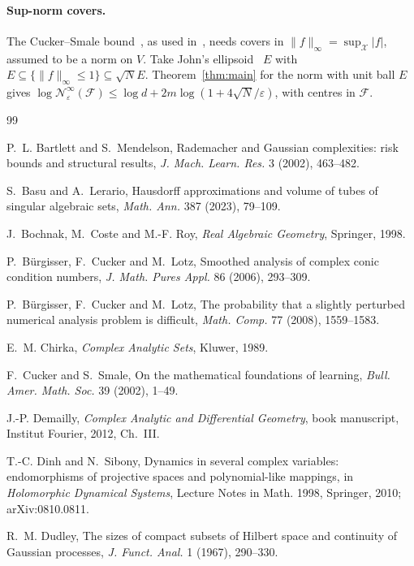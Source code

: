 \documentclass[11pt]{article}
\newcommand{\cN}{\mathcal{N}}
\newcommand{\cF}{\mathcal{F}}
\newcommand{\cX}{\mathcal{X}}
\begin{document}
\paragraph{Sup-norm covers.} The Cucker--Smale bound~\cite{CS02}, as used
in~\cite[Thm.~B.1]{MSMTK25}, needs covers in
$\|f\|_\infty=\sup_{\cX}|f|$, assumed to be a norm on $V$. Take John's
ellipsoid~\cite{Jo48} $E$ with $E\subseteq\{\|f\|_\infty\le1\}\subseteq\sqrt N E$.
Theorem~\ref{thm:main} for the norm with unit ball $E$ gives
$\log\cN^{\infty}_\varepsilon(\cF)\le\log d+2m\log(1+4\sqrt N/\varepsilon)$,
with centres in $\cF$.

\begin{thebibliography}{99}\footnotesize\setlength{\itemsep}{1pt}

 P.~L. Bartlett and S.~Mendelson, Rademacher and Gaussian
complexities: risk bounds and structural results, \emph{J. Mach. Learn. Res.}
3 (2002), 463--482.

 S.~Basu and A.~Lerario, Hausdorff approximations and volume of
tubes of singular algebraic sets, \emph{Math. Ann.} 387 (2023), 79--109.

 J.~Bochnak, M.~Coste and M.-F. Roy, \emph{Real Algebraic
Geometry}, Springer, 1998.

 P.~B\"urgisser, F.~Cucker and M.~Lotz, Smoothed analysis of
complex conic condition numbers, \emph{J. Math. Pures Appl.} 86 (2006),
293--309.

 P.~B\"urgisser, F.~Cucker and M.~Lotz, The probability that a
slightly perturbed numerical analysis problem is difficult, \emph{Math. Comp.}
77 (2008), 1559--1583.

 E.~M. Chirka, \emph{Complex Analytic Sets}, Kluwer, 1989.

 F.~Cucker and S.~Smale, On the mathematical foundations of
learning, \emph{Bull. Amer. Math. Soc.} 39 (2002), 1--49.

 J.-P. Demailly, \emph{Complex Analytic and Differential
Geometry}, book manuscript, Institut Fourier, 2012, Ch.~III.

 T.-C. Dinh and N.~Sibony, Dynamics in several complex variables:
endomorphisms of projective spaces and polynomial-like mappings, in
\emph{Holomorphic Dynamical Systems}, Lecture Notes in Math. 1998, Springer,
2010; arXiv:0810.0811.

 R.~M. Dudley, The sizes of compact subsets of Hilbert space and
continuity of Gaussian processes, \emph{J. Funct. Anal.} 1 (1967), 290--330.


\end{thebibliography}
\end{document}
